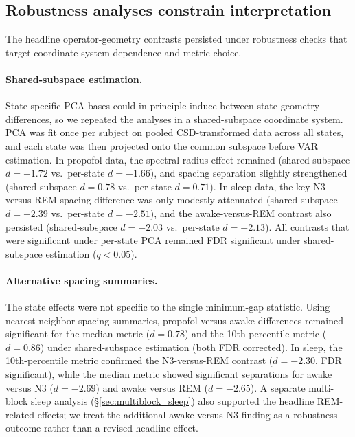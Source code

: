 \documentclass[preprint,12pt,nonatbib]{elsarticle}
\begin{document}
\subsection{Robustness analyses constrain interpretation}
The headline operator-geometry contrasts persisted under robustness checks that target coordinate-system dependence and metric choice.

\paragraph{Shared-subspace estimation.} State-specific PCA bases could in principle induce between-state geometry differences, so we repeated the analyses in a shared-subspace coordinate system. PCA was fit once per subject on pooled CSD-transformed data across all states, and each state was then projected onto the common subspace before VAR estimation. In propofol data, the spectral-radius effect remained (shared-subspace $d=-1.72$ vs.\ per-state $d=-1.66$), and spacing separation slightly strengthened (shared-subspace $d=0.78$ vs.\ per-state $d=0.71$). In sleep data, the key N3-versus-REM spacing difference was only modestly attenuated (shared-subspace $d=-2.39$ vs.\ per-state $d=-2.51$), and the awake-versus-REM contrast also persisted (shared-subspace $d=-2.03$ vs.\ per-state $d=-2.13$). All contrasts that were significant under per-state PCA remained FDR significant under shared-subspace estimation ($q<0.05$).

\paragraph{Alternative spacing summaries.} The state effects were not specific to the single minimum-gap statistic. Using nearest-neighbor spacing summaries, propofol-versus-awake differences remained significant for the median metric ($d=0.78$) and the 10th-percentile metric ($d=0.86$) under shared-subspace estimation (both FDR corrected). In sleep, the 10th-percentile metric confirmed the N3-versus-REM contrast ($d=-2.30$, FDR significant), while the median metric showed significant separations for awake versus N3 ($d=-2.69$) and awake versus REM ($d=-2.65$). A separate multi-block sleep analysis (\S\ref{sec:multiblock_sleep}) also supported the headline REM-related effects; we treat the additional awake-versus-N3 finding as a robustness outcome rather than a revised headline effect.
\end{document}
